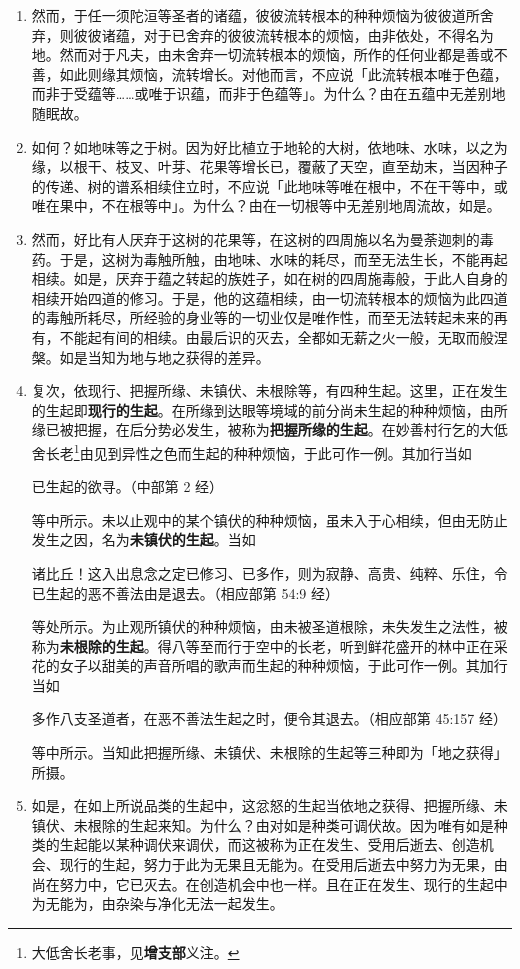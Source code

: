 \begin{enumerate}
\item 然而，于任一须陀洹等圣者的诸蕴，彼彼流转根本的种种烦恼为彼彼道所舍弃，则彼彼诸蕴，对于已舍弃的彼彼流转根本的烦恼，由非依处，不得名为地。然而对于凡夫，由未舍弃一切流转根本的烦恼，所作的任何业都是善或不善，如此则缘其烦恼，流转增长。对他而言，不应说「此流转根本唯于色蕴，而非于受蕴等……或唯于识蕴，而非于色蕴等」。为什么？由在五蕴中无差别地随眠故。
\item 如何？如地味等之于树。因为好比植立于地轮的大树，依地味、水味，以之为缘，以根干、枝叉、叶芽、花果等增长已，覆蔽了天空，直至劫末，当因种子的传递、树的谱系相续住立时，不应说「此地味等唯在根中，不在干等中，或唯在果中，不在根等中」。为什么？由在一切根等中无差别地周流故，如是。
\item 然而，好比有人厌弃于这树的花果等，在这树的四周施以名为曼荼迦刺的毒药。于是，这树为毒触所触，由地味、水味的耗尽，而至无法生长，不能再起相续。如是，厌弃于蕴之转起的族姓子，如在树的四周施毒般，于此人自身的相续开始四道的修习。于是，他的这蕴相续，由一切流转根本的烦恼为此四道的毒触所耗尽，所经验的身业等的一切业仅是唯作性，而至无法转起未来的再有，不能起有间的相续。由最后识的灭去，全都如无薪之火一般，无取而般涅槃。如是当知为地与地之获得的差异。
\item 复次，依现行、把握所缘、未镇伏、未根除等，有四种生起。这里，正在发生的生起即\textbf{现行的生起}。在所缘到达眼等境域的前分尚未生起的种种烦恼，由所缘已被把握，在后分势必发生，被称为\textbf{把握所缘的生起}。在妙善村行乞的大低舍长老\footnote{大低舍长老事，见\textbf{增支部}义注。}由见到异性之色而生起的种种烦恼，于此可作一例。其加行当如\begin{quoting}已生起的欲寻。（中部第 2 经）\end{quoting}等中所示。未以止观中的某个镇伏的种种烦恼，虽未入于心相续，但由无防止发生之因，名为\textbf{未镇伏的生起}。当如\begin{quoting}诸比丘！这入出息念之定已修习、已多作，则为寂静、高贵、纯粹、乐住，令已生起的恶不善法由是退去。（相应部第 54:9 经）\end{quoting}等处所示。为止观所镇伏的种种烦恼，由未被圣道根除，未失发生之法性，被称为\textbf{未根除的生起}。得八等至而行于空中的长老，听到鲜花盛开的林中正在采花的女子以甜美的声音所唱的歌声而生起的种种烦恼，于此可作一例。其加行当如\begin{quoting}多作八支圣道者，在恶不善法生起之时，便令其退去。（相应部第 45:157 经）\end{quoting}等中所示。当知此把握所缘、未镇伏、未根除的生起等三种即为「地之获得」所摄。
\item 如是，在如上所说品类的生起中，这忿怒的生起当依地之获得、把握所缘、未镇伏、未根除的生起来知。为什么？由对如是种类可调伏故。因为唯有如是种类的生起能以某种调伏来调伏，而这被称为正在发生、受用后逝去、创造机会、现行的生起，努力于此为无果且无能为。在受用后逝去中努力为无果，由尚在努力中，它已灭去。在创造机会中也一样。且在正在发生、现行的生起中为无能为，由杂染与净化无法一起发生。

\end{enumerate}
